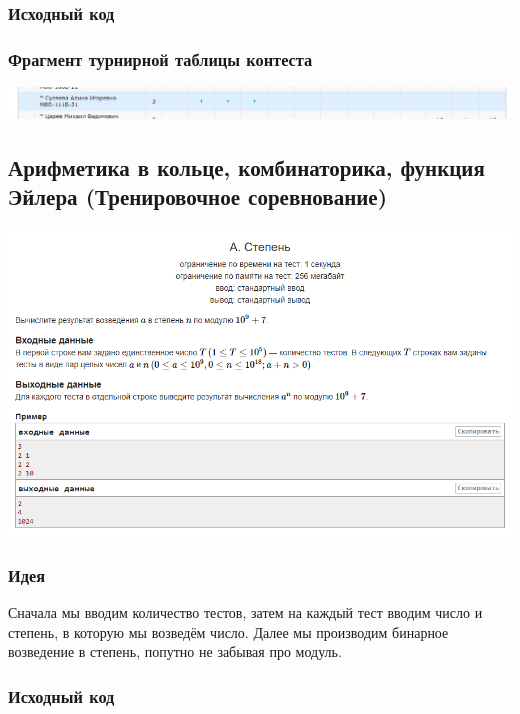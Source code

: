 \subsubsection*{Исходный код}



\subsubsection*{Фрагмент турнирной таблицы контеста}
\begin{center} 
\includegraphics[scale=0.5]{standings/6.png}\newline\noindent
\end{center} 
\pagebreak

\subsection*{Арифметика в кольце, комбинаторика, функция Эйлера (Тренировочное соревнование)}
\begin{center} 
\includegraphics[scale=0.75]{statements/7_A.png}
\end{center} 
\subsubsection*{Идея}
Сначала мы вводим количество тестов, затем на каждый тест вводим число и степень, в которую мы возведём число. Далее мы производим бинарное возведение в степень, попутно не забывая про модуль.
\subsubsection*{Исходный код}



